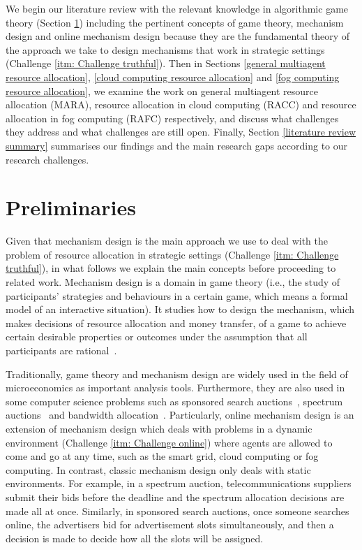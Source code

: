 \documentclass[11pt]{phdthesis}
\begin{document}
We begin our literature review with the relevant knowledge in algorithmic game theory (Section \ref{preliminaries}) including the pertinent concepts of game theory, mechanism design and online mechanism design because they are the fundamental theory of the approach we take to design mechanisms that work in strategic settings (Challenge \ref{itm: Challenge truthful}). Then in Sections \ref{general multiagent resource allocation}, \ref{cloud computing resource allocation} and \ref{fog computing resource allocation}, we examine the work on general multiagent resource allocation (MARA), resource allocation in cloud computing (RACC) and resource allocation in fog computing (RAFC) respectively, and discuss what challenges they address and what challenges are still open. Finally, Section \ref{literature review summary} summarises our findings and the main research gaps according to our research challenges.

\section{Preliminaries} \label{preliminaries}
Given that mechanism design is the main approach we use to deal with the problem of resource allocation in strategic settings (Challenge \ref{itm: Challenge truthful}), in what follows we explain the main concepts before proceeding to related work. Mechanism design is a domain in game theory (i.e., the study of participants' strategies and behaviours in a certain game, which means a formal model of an interactive situation). It studies how to design the mechanism, which makes decisions of resource allocation and money transfer, of a game to achieve certain desirable properties or outcomes under the assumption that all participants are rational~\citep{hurwicz1973design}. 

Traditionally, game theory and mechanism design are widely used in the field of microeconomics as important analysis tools. Furthermore, they are also used in some computer science problems such as sponsored search auctions~\citep{zhu2012truthful}, spectrum auctions~\citep{qin2015sponsored} and bandwidth allocation~\citep{wu2012auction}. Particularly, online mechanism design is an extension of mechanism design which deals with problems in a dynamic environment (Challenge \ref{itm: Challenge online}) where agents are allowed to come and go at any time, such as the smart grid, cloud computing or fog computing. In contrast, classic mechanism design only deals with static environments. For example, in a spectrum auction, telecommunications suppliers submit their bids before the deadline and the spectrum allocation decisions are made all at once. Similarly, in sponsored search auctions, once someone searches online, the advertisers bid for advertisement slots simultaneously, and then a decision is made to decide how all the slots will be assigned. 
\end{document}

